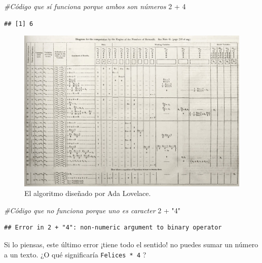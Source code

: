 \documentclass[
]{book}
\newenvironment{Shaded}{\begin{snugshade}}{\end{snugshade}}
\newcommand{\CommentTok}[1]{\textcolor[rgb]{0.56,0.35,0.01}{\textit{#1}}}
\newcommand{\DecValTok}[1]{\textcolor[rgb]{0.00,0.00,0.81}{#1}}
\newcommand{\SpecialCharTok}[1]{\textcolor[rgb]{0.00,0.00,0.00}{#1}}
\newcommand{\StringTok}[1]{\textcolor[rgb]{0.31,0.60,0.02}{#1}}
\begin{document}
\begin{Shaded}
\begin{Highlighting}[]
\CommentTok{\#Código que sí funciona porque ambos son números}
\DecValTok{2} \SpecialCharTok{+} \DecValTok{4} 
\end{Highlighting}
\end{Shaded}

\begin{verbatim}
## [1] 6
\end{verbatim}

\begin{figure}

{\centering \includegraphics[width=26.67in]{images/algorithm_lovelace} 

}

\caption{El algoritmo diseñado por Ada Lovelace.}\label{fig:unnamed-chunk-246}
\end{figure}

\begin{Shaded}
\begin{Highlighting}[]
\CommentTok{\#Código que no funciona porque uno es caracter}
\DecValTok{2} \SpecialCharTok{+} \StringTok{"4"} 
\end{Highlighting}
\end{Shaded}

\begin{verbatim}
## Error in 2 + "4": non-numeric argument to binary operator
\end{verbatim}

Si lo piensas, este último error ¡tiene todo el sentido! no puedes sumar un número a un texto. ¿O qué significaría \texttt{\textquotesingle{}Felices\textquotesingle{}\ *\ 4} ?
\end{document}
